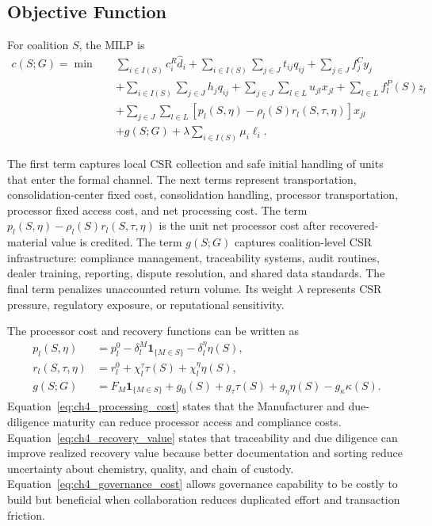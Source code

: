 \subsection{Objective Function}

For coalition $S$, the MILP is
\begin{equation}
\label{eq:objective}
\begin{aligned}
c(S;G)=\min \quad
& \sum_{i\in I(S)} c_i^R \widehat d_i
+ \sum_{i\in I(S)}\sum_{j\in J} t_{ij}q_{ij}
+ \sum_{j\in J} f_j^C y_j \\
& + \sum_{i\in I(S)}\sum_{j\in J} h_j q_{ij}
+ \sum_{j\in J}\sum_{l\in L} u_{jl}x_{jl}
+ \sum_{l\in L} f_l^P(S)z_l \\
& + \sum_{j\in J}\sum_{l\in L}\left[p_l(S,\eta)-\rho_l(S) r_l(S,\tau,\eta)\right]x_{jl}\\
& + g(S;G)
 + \lambda\sum_{i\in I(S)}\mu_i\ell_i .
\end{aligned}
\end{equation}

The first term captures local CSR collection and safe initial handling of units that enter the formal channel. The next terms represent transportation, consolidation-center fixed cost, consolidation handling, processor transportation, processor fixed access cost, and net processing cost. The term $p_l(S,\eta)-\rho_l(S)r_l(S,\tau,\eta)$ is the unit net processor cost after recovered-material value is credited. The term $g(S;G)$ captures coalition-level CSR infrastructure: compliance management, traceability systems, audit routines, dealer training, reporting, dispute resolution, and shared data standards. The final term penalizes unaccounted return volume. Its weight $\lambda$ represents CSR pressure, regulatory exposure, or reputational sensitivity.

The processor cost and recovery functions can be written as
\begin{align}
\label{eq:ch4_processing_cost}
p_l(S,\eta)
&=p_l^0-\delta_l^M\mathbf{1}_{\{M\in S\}}-\delta_l^\eta\eta(S),\\
\label{eq:ch4_recovery_value}
r_l(S,\tau,\eta)
&=r_l^0+\chi_l^\tau\tau(S)+\chi_l^\eta\eta(S),\\
\label{eq:ch4_governance_cost}
g(S;G)
&=F_M\mathbf{1}_{\{M\in S\}}+g_0(S)+g_\tau\tau(S)+g_\eta\eta(S)-g_\kappa\kappa(S).
\end{align}
Equation~\eqref{eq:ch4_processing_cost} states that the Manufacturer and due-diligence maturity can reduce processor access and compliance costs. Equation~\eqref{eq:ch4_recovery_value} states that traceability and due diligence can improve realized recovery value because better documentation and sorting reduce uncertainty about chemistry, quality, and chain of custody. Equation~\eqref{eq:ch4_governance_cost} allows governance capability to be costly to build but beneficial when collaboration reduces duplicated effort and transaction friction.

